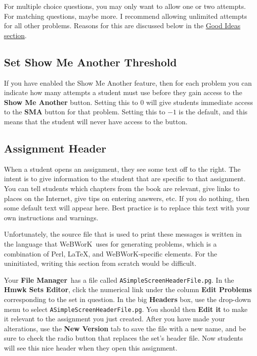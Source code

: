 \documentclass[12pt]{article}
\newcommand{\menu}[1]{\textbf{#1}}
\newcommand{\WW}{WeBWorK}
\newcommand{\HSE}{\menu{Hmwk Sets Editor}}
\newcommand{\FM}{\menu{File Manager}}
\begin{document}
For multiple choice questions, you may only want to allow one or two attempts.  For matching questions, maybe more. I recommend allowing unlimited attempts for all other problems.  Reasons for this are discussed below in the \hyperref[goodideas]{Good Ideas section}.  

\subsection{Set Show Me Another Threshold} If you have enabled the Show Me Another feature, then for each problem you can indicate how many attempts a student must use before they gain access to the \menu{Show Me Another} button. Setting this to $0$ will give students immediate access to the \menu{SMA} button for that problem. Setting this to $-1$ is the default, and this means that the student will never have access to the button.

\subsection{Assignment Header}  When a student opens an assignment, they see some text off to the right.  The intent is to give information to the student that are specific to that assignment.  You can tell students which chapters from the book are relevant, give links to places on the Internet, give tips on entering answers, etc. If you do nothing, then some default text will appear here.  Best practice is to replace this text with your own instructions and warnings.  

Unfortunately, the source file that is used to print these messages is written in the language that \WW\ uses for generating problems, which is a combination of Perl, \LaTeX, and \WW-specific elements.  For the uninitiated, writing this section from scratch would be difficult. 

Your \FM\  has a file called \texttt{ASimpleScreenHeaderFile.pg}.   In the \HSE, click the numerical link under the column \menu{Edit Problems} corresponding to the set in question.  In the big \menu{Headers} box, use the drop-down menu to select \texttt{ASimpleScreenHeaderFile.pg}.  You should then \menu{Edit it} to make it relevant to the assignment you just created. After you have made your alterations, use the \menu{New Version} tab to save the file with a new name, and be sure to check the radio button that replaces the set's header file.  Now students will see this nice header when they open this assignment.
\end{document}
